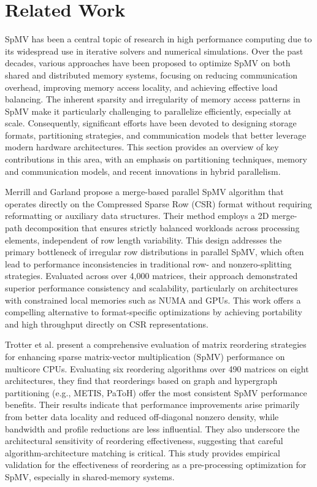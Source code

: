 \chapter{Related Work}
SpMV has been a central topic of research in high performance computing due to its widespread use in iterative solvers and numerical simulations. Over the past decades, various approaches have been proposed to optimize SpMV on both shared and distributed memory systems, focusing on reducing communication overhead, improving memory access locality, and achieving effective load balancing. The inherent sparsity and irregularity of memory access patterns in SpMV make it particularly challenging to parallelize efficiently, especially at scale. Consequently, significant efforts have been devoted to designing storage formats, partitioning strategies, and communication models that better leverage modern hardware architectures. This section provides an overview of key contributions in this area, with an emphasis on partitioning techniques, memory and communication models, and recent innovations in hybrid parallelism.

Merrill and Garland \cite{merrilduane} propose a merge-based parallel SpMV algorithm that operates directly on the Compressed Sparse Row (CSR) format without requiring reformatting or auxiliary data structures. Their method employs a 2D merge-path decomposition that ensures strictly balanced workloads across processing elements, independent of row length variability. This design addresses the primary bottleneck of irregular row distributions in parallel SpMV, which often lead to performance inconsistencies in traditional row- and nonzero-splitting strategies. Evaluated across over 4,000 matrices, their approach demonstrated superior performance consistency and scalability, particularly on architectures with constrained local memories such as NUMA and GPUs. This work offers a compelling alternative to format-specific optimizations by achieving portability and high throughput directly on CSR representations.
\medskip

Trotter et al. \cite{ordersparse} present a comprehensive evaluation of matrix reordering strategies for enhancing sparse matrix-vector multiplication (SpMV) performance on multicore CPUs. Evaluating six reordering algorithms over 490 matrices on eight architectures, they find that reorderings based on graph and hypergraph partitioning (e.g., METIS, PaToH) offer the most consistent SpMV performance benefits. Their results indicate that performance improvements arise primarily from better data locality and reduced off-diagonal nonzero density, while bandwidth and profile reductions are less influential. They also underscore the architectural sensitivity of reordering effectiveness, suggesting that careful algorithm-architecture matching is critical. This study provides empirical validation for the effectiveness of reordering as a pre-processing optimization for SpMV, especially in shared-memory systems.


